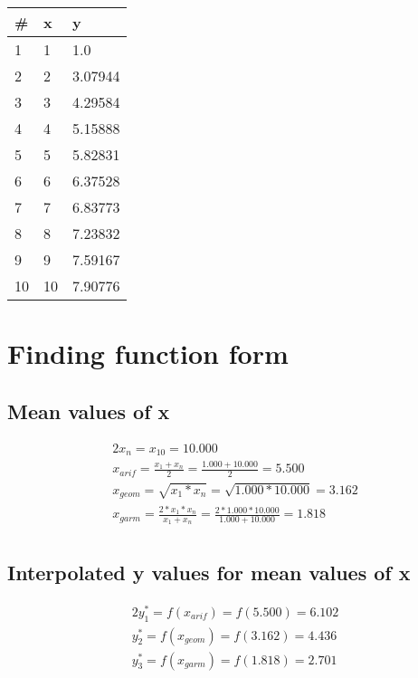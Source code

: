 \documentclass{article}%
\begin{document}
%
\normalsize%
\begin{longtable}{l l l}%
\hline%
\#&x&y\\%
\hline%
\endhead%
1&1&1.0\\%
2&2&3.07944\\%
3&3&4.29584\\%
4&4&5.15888\\%
5&5&5.82831\\%
6&6&6.37528\\%
7&7&6.83773\\%
8&8&7.23832\\%
9&9&7.59167\\%
10&10&7.90776\\%
\end{longtable}%
\section{Finding function form}%
\label{sec:Findingfunctionform}%
\subsection{Mean values of x}%
\label{subsec:Meanvaluesofx}%
\begin{alignat*}{2}%
x_n = x_{10} = {10.000} \\%
x_{arif}
        = \frac {x_1 + x_n} 2
        = \frac {1.000 + 10.000} 2
        = 5.500 \\%
x_{geom}
        = \sqrt {x_1 * x_n}
        = \sqrt {1.000 * 10.000}
        = 3.162 \\%
x_{garm}
        = \frac {2 * x_1 * x_n} {x_1 + x_n}
        = \frac {2 * 1.000 * 10.000} {1.000 + 10.000}
        = 1.818 \\%
\end{alignat*}

%
\subsection{Interpolated y values for mean values of x}%
\label{subsec:Interpolatedyvaluesformeanvaluesofx}%
\begin{alignat*}{2}%
y_1^*
                        = f(x_{arif})
                        = f(5.500)
                        = 6.102 \\%
y_2^*
                        = f(x_{geom})
                        = f(3.162)
                        = 4.436 \\%
y_3^*
                        = f(x_{garm})
                        = f(1.818)
                        = 2.701 \\%
\end{alignat*}
\end{document}
